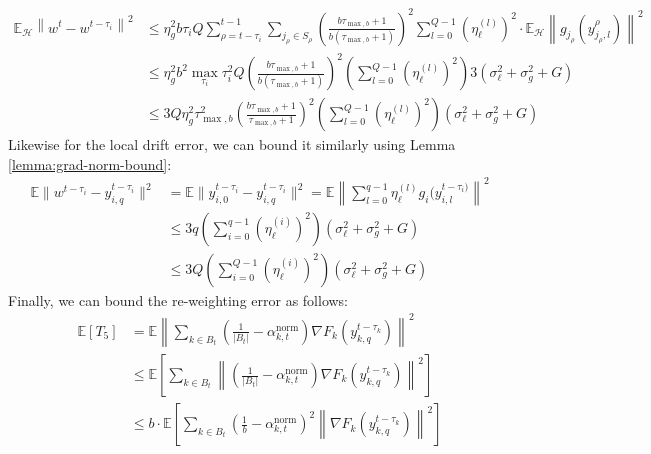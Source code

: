 \documentclass{article}
\begin{document}
\begin{align*}
    \mathbb{E}_\mathcal{H}\left\|
        w^t - w^{t - \tau_i}
    \right\|^2
    &\leq 
    \eta_g^2 b \tau_i Q
        \sum_{\rho = t - \tau_i}^{t-1}
        {
           \sum_{j_\rho \in S_\rho}
           {
                \left( \frac{b\tau_{\max, b} + 1}{b(\tau_{\max, b} + 1)}\right)^2
                \sum_{l=0}^{Q-1}
                {
                \left(
                    \eta_\ell^{(l)}
                \right)^2
                \cdot
                \mathbb{E}_\mathcal{H}
                \left\|
                g_{j_\rho}(y^\rho_{j_\rho, l})
                 \right\|^2
                } 
           }
        }
    \\ 
    &\leq 
    \eta_g^2 b^2 \max_{\tau_i}{\tau_i^2} Q
            \left( \frac{b\tau_{\max, b} + 1}{b(\tau_{\max, b} + 1)}\right)^2
            \left(
            \sum_{l=0}^{Q-1}
            {
                \left(
                    \eta_\ell^{(l)}
                \right)^2
            }
            \right)
            3\left(\sigma_\ell^2 + \sigma^2_g + G \right)
    \\
    &\leq 
    3Q\eta_g^2 \tau_{\max, b}^2 
            \left( \frac{b\tau_{\max, b} + 1}{\tau_{\max, b} + 1}\right)^2
            \left(
            \sum_{l=0}^{Q-1}
            {
                \left(
                    \eta_\ell^{(l)}
                \right)^2
            }
            \right)
            \left(\sigma_\ell^2 + \sigma^2_g + G \right)
\end{align*}
Likewise for the local drift error, we can bound it similarly using Lemma \ref{lemma:grad-norm-bound}:
\begin{align*}
    \mathbb{E} \| w^{t-\tau_i} - y_{i, q}^{t - \tau_i} \|^2 &=  \mathbb{E} \| y_{i,0}^{t - \tau_i} - y_{i, q}^{t - \tau_i} \|^2 = \mathbb{E}\left\|
        \sum_{l=0}^{q-1}{
         \eta_\ell^{(l)} g_i(y_{i, l}^{t - \tau_i)}
        }
    \right\|^2 
    \\
    &\leq 
    3q \left(
        \sum_{i=0}^{q-1}{\left(\eta_\ell^{(i)}\right)^2}
    \right) ( \sigma_\ell^2 + \sigma_g^2 + G)
    \\
    &\leq 
    3Q \left(
        \sum_{i=0}^{Q-1}{\left(\eta_\ell^{(i)}\right)^2}
    \right) ( \sigma_\ell^2 + \sigma_g^2 + G)
\end{align*}
Finally, we can bound the re-weighting error as follows:
\begin{align*}
    \mathbb{E}[T_5]
    &= \mathbb{E} \left\|
         \sum_{k \in B_t}{
             \left( \frac{1}{|B_t|} -  \alpha^{\text{norm}}_{k, t}\right)\nabla F_k(y_{k, q}^{t - \tau_k})
        }
    \right\|^2
    \\
    &\leq \mathbb{E}\left[
        \sum_{k \in B_t}{
            \left\|
                \left(
                    \frac{1}{|B_t|} -  \alpha^{\text{norm}}_{k, t}
                \right)\nabla F_k(y_{k, q}^{t - \tau_k})
            \right\|^2
        }
    \right]
    \\
    &\leq b \cdot \mathbb{E}\left[
        \sum_{k \in B_t}{
            \left(
                \frac{1}{b} -  \alpha^{\text{norm}}_{k, t}
            \right)^2 
            \left\|
                \nabla F_k(y_{k, q}^{t - \tau_k})
            \right\|^2
        }
    \right]
\end{align*}
\end{document}
